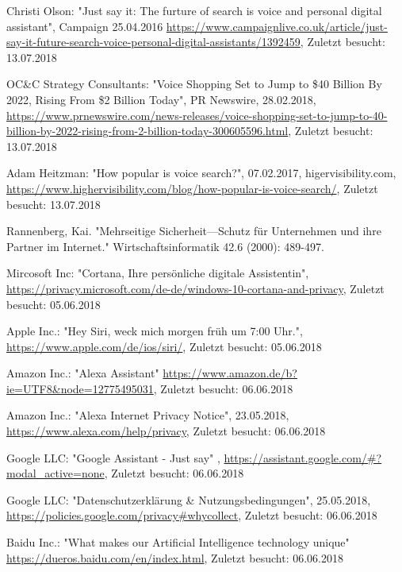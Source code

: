 \documentclass[journal]{IEEEtran}
\begin{document}
\begin{thebibliography}{1}
Christi Olson: "Just say it: The furture of search is voice and personal digital assistant", Campaign 25.04.2016 \url{https://www.campaignlive.co.uk/article/just-say-it-future-search-voice-personal-digital-assistants/1392459},
Zuletzt besucht: 13.07.2018

OC\&C Strategy Consultants: "Voice Shopping Set to Jump to \$40 Billion By 2022, Rising From \$2 Billion Today", PR Newswire, 28.02.2018, \url{https://www.prnewswire.com/news-releases/voice-shopping-set-to-jump-to-40-billion-by-2022-rising-from-2-billion-today-300605596.html}, 
Zuletzt besucht: 13.07.2018

Adam Heitzman: "How popular is voice search?", 07.02.2017, higervisibility.com, \url{https://www.highervisibility.com/blog/how-popular-is-voice-search/},
Zuletzt besucht: 13.07.2018

Rannenberg, Kai. "Mehrseitige Sicherheit—Schutz für Unternehmen und ihre Partner im Internet." Wirtschaftsinformatik 42.6 (2000): 489-497.

Mircosoft Inc: "Cortana, Ihre persönliche digitale Assistentin", \url{https://privacy.microsoft.com/de-de/windows-10-cortana-and-privacy},
Zuletzt besucht: 05.06.2018

Apple Inc.: "Hey Siri, weck mich morgen früh um 7:00 Uhr.",
\url{https://www.apple.com/de/ios/siri/},
Zuletzt besucht: 05.06.2018

Amazon Inc.: "Alexa Assistant"
\url{https://www.amazon.de/b?ie=UTF8&node=12775495031},
Zuletzt besucht: 06.06.2018

Amazon Inc.: "Alexa Internet Privacy Notice", 23.05.2018,
\url{https://www.alexa.com/help/privacy},
Zuletzt besucht: 06.06.2018

Google LLC: "Google Assistant - Just say" ,
\url{https://assistant.google.com/#?modal_active=none},
Zuletzt besucht: 06.06.2018

Google LLC: "Datenschutzerklärung \& Nutzungsbedingungen", 25.05.2018, \url{https://policies.google.com/privacy#whycollect},
Zuletzt besucht: 06.06.2018

Baidu Inc.: "What makes our Artificial Intelligence technology unique"  \url{https://dueros.baidu.com/en/index.html},
Zuletzt besucht: 06.06.2018


\end{thebibliography}
\end{document}
